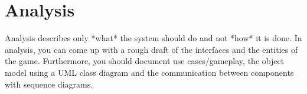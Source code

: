 \section{Analysis}
Analysis describes only *what* the system should do and not *how* it is done.
In analysis, you can come up with a rough draft of the interfaces and the entities of the game.
Furthermore, you should document use cases/gameplay, the object model using a UML class diagram and the communication between components with sequence diagrams.
